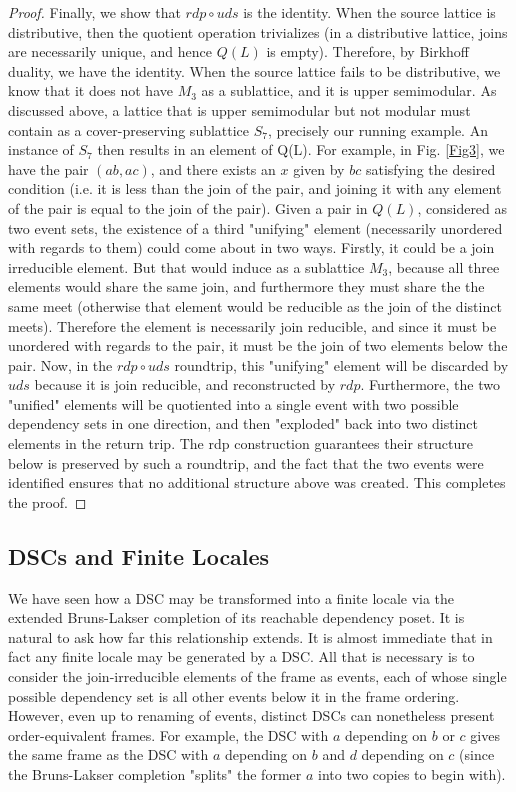 \documentclass[hoptionsi,review,format=acmsmall]{acmart}
\theoremstyle{definition}
\begin{document}
\begin{proof}
Finally, we show that \(rdp \circ uds\) is the identity. When the source lattice is distributive, then the quotient operation trivializes (in a distributive lattice, joins are necessarily unique, and hence \(Q(L)\) is empty). Therefore, by Birkhoff duality, we have the identity. When the source lattice fails to be distributive, we know that it does not have \(M_3\) as a sublattice, and it is upper semimodular. As discussed above, a lattice that is upper semimodular but not modular must contain as a cover-preserving sublattice \(S_7\), precisely our running example. An instance of \(S_7\) then results in an element of Q(L). For example, in Fig. \ref{Fig3},  we have the pair \((ab,ac)\), and there exists an \(x\) given by \(bc\) satisfying the desired condition (i.e. it is less than the join of the pair, and joining it with any element of the pair is equal to the join of the pair). Given a pair in \(Q(L)\), considered as two event sets, the existence of a third "unifying" element (necessarily unordered with regards to them) could come about in two ways. Firstly, it could be a join irreducible element. But that would induce as a sublattice \(M_3\), because all three elements would share the same join, and furthermore they must share the the same meet (otherwise that element would be reducible as the join of the distinct meets). Therefore the element is necessarily join reducible, and since it must be unordered with regards to the pair, it must be the join of two elements below the pair. Now, in the \(rdp \circ uds\) roundtrip, this "unifying" element will be discarded by \(uds\) because it is join reducible, and reconstructed by \(rdp\). Furthermore, the two "unified" elements will be quotiented into a single event with two possible dependency sets in one direction, and then "exploded" back into two distinct elements in the return trip. The rdp construction guarantees their structure below is preserved by such a roundtrip, and the fact that the two events were identified ensures that no additional structure above was created. This completes the proof.
\end{proof}


\subsection{DSCs and Finite Locales}

We have seen how a DSC may be transformed into a finite locale via the extended Bruns-Lakser completion of its reachable dependency poset. It is natural to ask how far this relationship extends. It is almost immediate that in fact any finite locale may be generated by a DSC. All that is necessary is to consider the join-irreducible elements of the frame as events, each of whose single possible dependency set is all other events below it in the frame ordering. However, even up to renaming of events, distinct DSCs can nonetheless present order-equivalent frames. For example, the DSC with \(a\) depending on \(b\) or \(c\) gives the same frame as the DSC with \(a\) depending on \(b\) and \(d\) depending on \(c\) (since the Bruns-Lakser completion "splits" the former \(a\) into two copies to begin with). 
\end{document}
